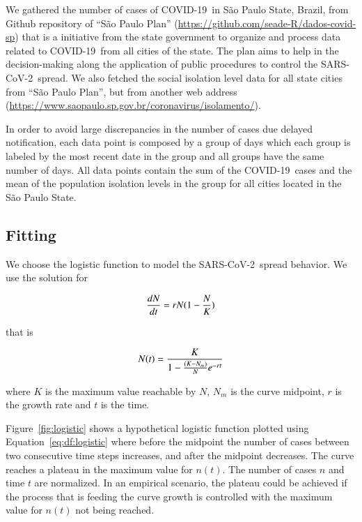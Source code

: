 \documentclass[review]{elsarticle}
\def\covid{\hbox{COVID-19}} %
\def\sarscov{{SARS-CoV-2}}
\def\eq#1{Equation~#1}
\def\fig#1{Figure~#1}
\begin{document}
We gathered the number of cases of \covid\ 
in S\~{a}o Paulo State, Brazil, 
from Github repository of ``S\~{a}o Paulo Plan'' 
(\url{https://github.com/seade-R/dados-covid-sp}) 
that is a initiative from the state government 
to organize and process data related to \covid \
from all cities of the state. 
The plan aims to help in the decision-making 
along the application of public 
procedures to control the \sarscov\ spread. 
We also fetched the social isolation level data 
for all state cities  from 
``S\~{a}o Paulo Plan'', but from another web address 
(\url{https://www.saopaulo.sp.gov.br/coronavirus/isolamento/}).

In order to avoid large discrepancies 
in the number of cases due delayed notification, 
 each data point is composed by a group of days 
 which each group is labeled by the most 
 recent date in the group and 
 all groups have the same number of days. 
 All data points contain 
 the sum of the \covid\ cases and 
 the mean of the population isolation levels 
 in the group for all cities 
 located in the S\~{a}o Paulo State.

\subsection{Fitting}

We choose the logistic function to model 
the \sarscov\ spread behavior. We use the 
solution for

\begin{equation}
{dN \over dt} = r N (1 - {N \over K})
\label{eq:df:logistic}
\end{equation}

\noindent that is

\begin{equation}
N(t) = {K \over {1- {(K-N_{m}) \over N} e^{-rt}}}
\label{eq:exp:logistic}
\end{equation}

\noindent where $K$ is the maximum value reachable by $N$, 
$N_m$ is the curve midpoint, 
$r$ is the growth rate 
and $t$ is the time.

\fig{\ref{fig:logistic}} shows a hypothetical logistic function 
plotted using \eq{\ref{eq:df:logistic}} where before the midpoint 
the number of cases between 
two consecutive time steps increases, 
and after the midpoint decreases. 
The curve reaches a plateau in the maximum value for $n(t)$. 
The number of cases $n$ and time $t$ are normalized.
In an empirical scenario, the plateau could be achieved 
if the process that is feeding the curve 
growth is controlled with the maximum 
value for $n(t)$ not being reached.
\end{document}
